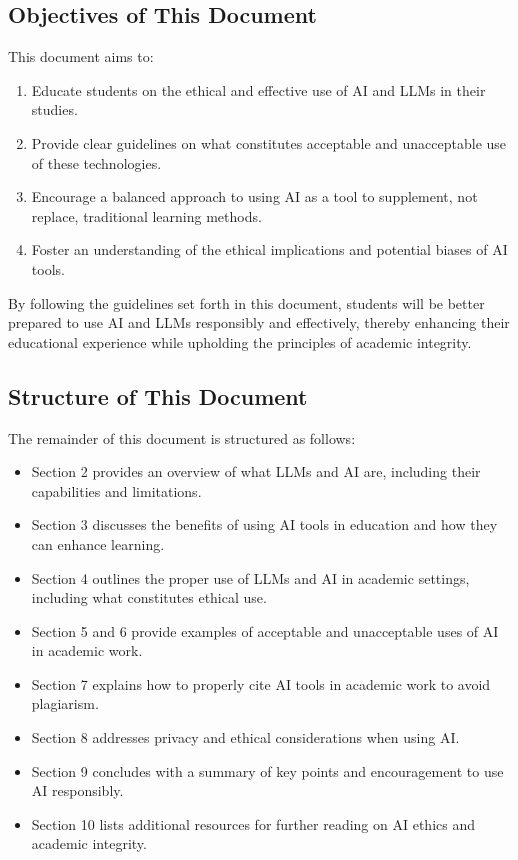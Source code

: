 \documentclass{article}
\begin{document}
\subsection{Objectives of This Document}

This document aims to:
\begin{enumerate}
    \item Educate students on the ethical and effective use of AI and LLMs in their studies.
    \item Provide clear guidelines on what constitutes acceptable and unacceptable use of these technologies.
    \item Encourage a balanced approach to using AI as a tool to supplement, not replace, traditional learning methods.
    \item Foster an understanding of the ethical implications and potential biases of AI tools.
\end{enumerate}

By following the guidelines set forth in this document, students will be better prepared to use AI and LLMs responsibly and effectively, thereby enhancing their educational experience while upholding the principles of academic integrity.

\subsection{Structure of This Document}

The remainder of this document is structured as follows:
\begin{itemize}
    \item Section 2 provides an overview of what LLMs and AI are, including their capabilities and limitations.
    \item Section 3 discusses the benefits of using AI tools in education and how they can enhance learning.
    \item Section 4 outlines the proper use of LLMs and AI in academic settings, including what constitutes ethical use.
    \item Section 5 and 6 provide examples of acceptable and unacceptable uses of AI in academic work.
    \item Section 7 explains how to properly cite AI tools in academic work to avoid plagiarism.
    \item Section 8 addresses privacy and ethical considerations when using AI.
    \item Section 9 concludes with a summary of key points and encouragement to use AI responsibly.
    \item Section 10 lists additional resources for further reading on AI ethics and academic integrity.
\end{itemize}
\end{document}
